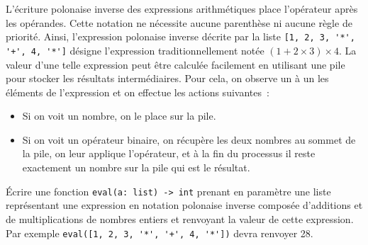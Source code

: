 \documentclass{magnolia}
\begin{document}
L'écriture polonaise inverse des expressions arithmétiques place l'opérateur après les
opérandes. Cette notation ne nécessite aucune parenthèse ni aucune règle de priorité.
Ainsi, l'expression polonaise inverse décrite par la liste
\verb![1, 2, 3, '*', '+', 4, '*']! désigne l'expression traditionnellement notée $(1+2\times 3)\times 4$.
La valeur d'une telle expression peut être calculée facilement en utilisant une pile pour
stocker les résultats intermédiaires. Pour cela, on observe un à un les éléments de
l'expression et on effectue les actions suivantes~:
\begin{itemize}
\item Si on voit un nombre, on le place sur la pile.
\item Si on voit un opérateur binaire, on récupère les deux nombres au sommet de la pile,
  on leur applique l'opérateur, et à la fin du processus il reste exactement un nombre sur
	la pile qui est le résultat.
\end{itemize}
Écrire une fonction \verb!eval(a: list) -> int! prenant en paramètre une liste représentant une expression
en notation polonaise inverse composée d'additions et de multiplications de nombres entiers
et renvoyant la valeur de cette expression. Par exemple \verb!eval([1, 2, 3, '*', '+', 4, '*'])!
devra renvoyer 28.


\end{document}
